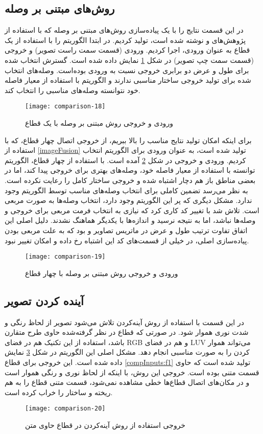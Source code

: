 \subsection{روش‌های مبتنی بر وصله} \label{patchBasedRes}
در این قسمت نتایج را با یک پیاده‌سازی روش‌های مبتنی بر وصله\cite{patchBaseGit} که با استفاده از پژوهش‌های 
و
نوشته شده است، تولید کردیم. در ابتدا الگوریتم را با استفاده از یک قطاع به عنوان ورودی، اجرا کردیم. ورودی (قسمت سمت راست تصویر) و خروجی (قسمت سمت چپ تصویر) در شکل \ref{patch1} نمایش داده شده است. گسترش انتخاب شده برای طول و عرض دو برابری خروجی نسبت به ورودی بوده‌است. وصله‌های انتخاب شده برای تولید خروجی ساختار مناسبی ندارند و الگوریتم با استفاده از معیار فاصله خود نتوانسته وصله‌های مناسبی را انتخاب کند.
\begin{figure}[h!]
	\centering
	\texttt{[image: comparison-18]}
	\caption{ورودی و خروجی روش مبتنی بر وصله با یک قطاع}
	\label{patch1}
\end{figure}
\newline
برای اینکه امکان تولید نتایج مناسب را بالا ببریم، از خروجی اتصال چهار قطاع، که با استفاده از \ref{imageFusion} تولید شده است، به عنوان ورودی برای الگوریتم انتخاب کردیم. ورودی و خروجی در شکل \ref{patch2} آمده است. با استفاده از چهار قطاع، الگوریتم توانسته با استفاده از معیار فاصله خود، وصله‌های بهتری برای خروجی پیدا کند، اما در بعضی مناطق باز هم دچار اشتباه شده و خروجی ساختار کامل را رعایت نکرده است. به نظر می‌رسد تضمین کاملی برای انتخاب وصله‌های مناسب توسط الگوریتم وجود ندارد. مشکل دیگری که پر این الگوریتم وجود دارد، انتخاب وصله‌ها به صورت مربعی است. تلاش شد با تغییر کد کاری کرد که نیازی به انتخاب فرمت مربعی برای خروجی و وصله‌ها نباشد، اما به نتیجه نرسید و اندازه‌ها با یکدیگر هماهنگ نشدند. دلیل اصلی این اتفاق تفاوت ترتیب طول و عرض در ماتریس تصاویر 
و 
 بود که به علت مربعی بودن پیاده‌سازی اصلی، در خیلی از قسمت‌های کد این اشتباه رخ داده و امکان تغییر نبود.
\begin{figure}[h!]
	\centering
	\texttt{[image: comparison-19]}
	\caption{ورودی و خروجی روش مبتنی بر وصله با چهار قطاع}
	\label{patch2}
\end{figure}

\subsection{آینده کردن تصویر} \label{mirroringRes}
در این قسمت با استفاده از روش آینه‌کردن تلاش می‌شود تصویر از لحاظ رنگی و شدت نوری هموار شود. در صورتی که قطاع در نظر گرفته‌شده حاوی طرح متقارن باشد، استفاده از این تکنیک هم در فضای RGB و هم در فضای LUV می‌تواند هموار کردن را به صورت مناسبی انجام دهد. مشکل اصلی این الگوریتم در شکل \ref{mirroring} نمایش داده شده است. این خروجی برای قطاع \ref{compInputs:f1} تولید شده است که حاوی قسمت متنی بوده است. خروجی این روش، با اینکه از لحاظ نوری و رنگی هموار است و در مکان‌های اتصال قطاع‌ها خطی مشاهده نمی‌شود، قسمت متنی قطاع را به هم ریخته و ساختار را خراب کرده است.
\begin{figure}[h!]
	\centering
	\texttt{[image: comparison-20]}
	\caption{خروجی استفاده از روش آینه‌کردن در قطاع حاوی متن}
	\label{mirroring}
\end{figure}

